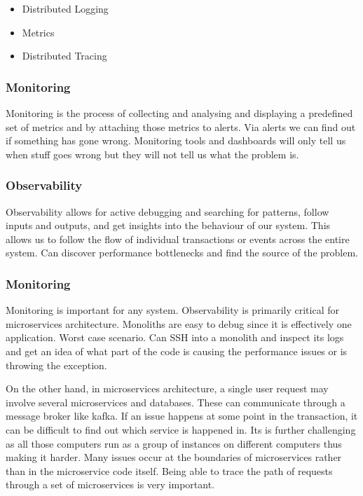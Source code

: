 \begin{itemize}
    \item Distributed Logging
    \item Metrics
    \item Distributed Tracing
\end{itemize}

\subsubsection{Monitoring}
Monitoring is the process of collecting and analysing and displaying a predefined set of metrics and by attaching those metrics to alerts.
Via alerts we can find out if something has gone wrong.
Monitoring tools and dashboards will only tell us when stuff goes wrong but they will not tell us what the problem is.

\subsubsection{Observability}
Observability allows for active debugging and searching for patterns, follow inputs and outputs, and get insights into the behaviour of our system.
This allows us to follow the flow of individual transactions or events across the entire system.
Can discover performance bottlenecks and find the source of the problem.

\subsubsection{Monitoring}
Monitoring is important for any system.
Observability is primarily critical for microservices architecture.
Monoliths are easy to debug since it is effectively one application.
Worst case scenario.
Can SSH into a monolith and inspect its logs and get an idea of what part of the code is causing the performance issues or is throwing the exception.

On the other hand, in microservices architecture, a single user request may involve several microservices and databases.
These can communicate through a message broker like kafka.
If an issue happens at some point in the transaction, it can be difficult to find out which service is happened in.
Its is further challenging as all those computers run as a group of instances on different computers thus making it harder.
Many issues occur at the boundaries of microservices rather than in the microservice code itself.
Being able to trace the path of requests through a set of microservices is very important.

